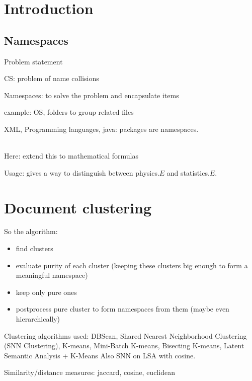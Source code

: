 \section{Introduction}


\subsection{Namespaces}

Problem statement

CS: problem of name collisions

Namespaces: to solve the problem and encapsulate items

example: OS, folders to group related files

XML, Programming languages, java: packages are namespaces. 

\ \\

Here: extend this to mathematical formulas



Usage: gives a way to distinguish between physics.$E$ and statistics.$E$.



\section{Document clustering}



So the algorithm:

\begin{itemize}
  \item  find clusters
  \item evaluate purity of each cluster (keeping these clusters big enough to form a meaningful namespace)
  \item keep only pure ones
  \item postprocess pure cluster to form namespaces from them (maybe even hierarchically)
\end{itemize}




Clustering algorithms used: DBScan, Shared Nearest Neighborhood Clustering (SNN Clustering), K-means, Mini-Batch K-means, Bisecting K-means, Latent Semantic Analysis + K-Means
Also SNN on LSA with cosine.

Similarity/distance measures: jaccard, cosine, euclidean



